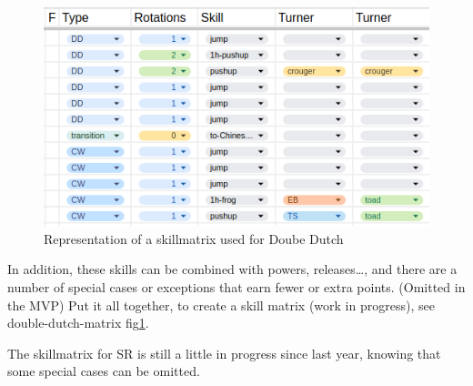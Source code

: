 \begin{figure}
    \centering
    \includegraphics[width=0.7\linewidth]{img/doubledutch-matrix}
    \caption[skillmatrix-DD]{Representation of a skillmatrix used for Doube Dutch}
    \label{fig:doubledutch-skillmatrix}
\end{figure}

In addition, these skills can be combined with powers, releases\dots, and there are a number of special cases or exceptions that earn fewer or extra points. (Omitted in the MVP)
Put it all together, to create a skill matrix (work in progress), see double-dutch-matrix fig\ref{fig:doubledutch-skillmatrix}.

The skillmatrix for SR is still a little in progress since last year, knowing that some special cases can be omitted.


    

